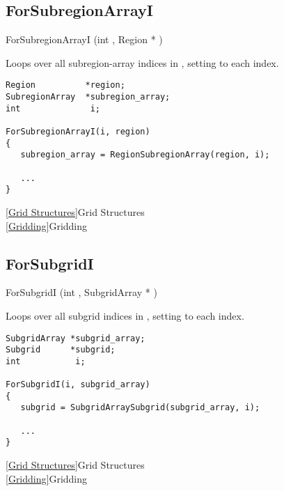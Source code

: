 \newpage
\subsection{ForSubregionArrayI}
\label{ForSubregionArrayI}


\begin{defmac} ForSubregionArrayI (int , {Region *} )

\DESCRIPTION
Loops over all subregion-array indices in , setting
 to each index.

\EXAMPLE
\mbox{}
\begin{display}\begin{verbatim}
Region          *region;
SubregionArray  *subregion_array;
int              i;

ForSubregionArrayI(i, region)
{
   subregion_array = RegionSubregionArray(region, i);

   ...
}
\end{verbatim}\end{display}


\SEEALSO
\vref{Grid Structures}{Grid Structures}\\
\vref{Gridding}{Gridding}

\end{defmac}


\newpage
\subsection{ForSubgridI}
\label{ForSubgridI}


\begin{defmac} ForSubgridI (int , {SubgridArray *} )

\DESCRIPTION
Loops over all subgrid indices in , setting
 to each index.

\EXAMPLE
\mbox{}
\begin{display}\begin{verbatim}
SubgridArray *subgrid_array;
Subgrid      *subgrid;
int           i;

ForSubgridI(i, subgrid_array)
{
   subgrid = SubgridArraySubgrid(subgrid_array, i);

   ...
}
\end{verbatim}\end{display}

\SEEALSO
\vref{Grid Structures}{Grid Structures}\\
\vref{Gridding}{Gridding}

\end{defmac}

